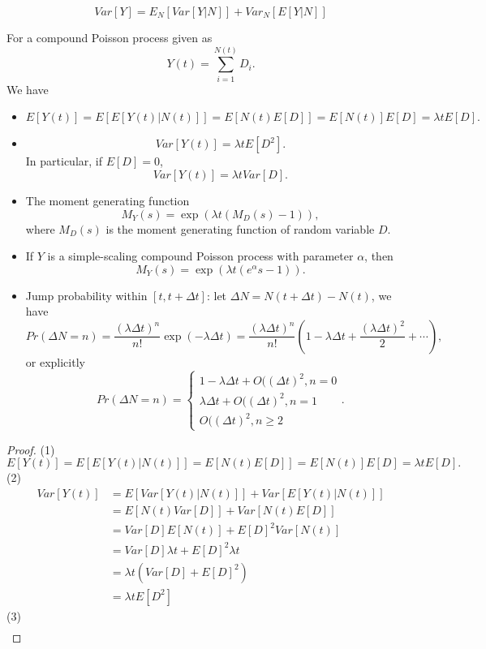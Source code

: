 \begin{refsection}
\begin{lemma}
	$$Var[Y] = E_N[Var[Y|N]] + Var_N[E[Y|N]]$$
\end{lemma}

\begin{lemma}\label{ch:theory-of-stochastic-process:th:BasicPropertiesOfCompoundPoissonProcess}
	For a compound Poisson process given as
	$$Y(t) = \sum_{i=1}^{N(t)}D_i.$$
	We have
	\begin{itemize}
		
		\item $$E[Y(t)] = E[E[Y(t)|N(t)]] = E[N(t)E[D]] = E[N(t)]E[D] = \lambda t E[D].$$
		\item $$Var[Y(t)] = \lambda t E[D^2].$$
		In particular, if $E[D] = 0$, $$Var[Y(t)] = \lambda t Var[D].$$	
		\item The moment generating function $$M_Y(s) = \exp(\lambda t(M_D(s)-1)),$$
		where $M_D(s)$ is the moment generating function of random variable $D$.
		\item If $Y$ is a simple-scaling compound Poisson process with parameter $\alpha$, then
		$$M_Y(s) = \exp(\lambda t(e^\alpha s-1)).$$
		\item Jump probability within $[t,t+\Delta t]$: let $\Delta N = N(t+\Delta t) - N(t)$, we have
		$$Pr(\Delta N = n) = \frac{(\lambda\Delta t)^n}{n!} \exp(-\lambda \Delta t) = \frac{(\lambda\Delta t)^n}{n!}(1 - \lambda\Delta t + \frac{(\lambda \Delta t)^2}{2} + \cdots),$$
		or explicitly
		$$Pr(\Delta N = n) = \begin{cases*}
		1 - \lambda\Delta t + O((\Delta t)^2, n = 0\\
		\lambda\Delta t + O((\Delta t)^2, n = 1\\
		O((\Delta t)^2, n\geq 2
		\end{cases*}.$$
	\end{itemize}
\end{lemma}
\begin{proof}
	(1)
	$$E[Y(t)] = E[E[Y(t)|N(t)]] = E[N(t)E[D]] = E[N(t)]E[D] = \lambda t E[D].$$
	(2)
	\begin{align*}
	Var[Y(t)] &= E[Var[Y(t)|N(t)]] + Var[E[Y(t)|N(t)]]\\
	&=E[N(t)Var[D]] + Var[N(t)E[D]]\\
	&=Var[D]E[N(t)] + E[D]^2Var[N(t)]\\
	&=Var[D]\lambda t + E[D]^2\lambda t\\
	&=\lambda t(Var[D] + E[D]^2)\\
	&=\lambda t E[D^2]
	\end{align*}	
	(3)
	\begin{align*}

\end{align*}
\end{proof}
\end{refsection}
